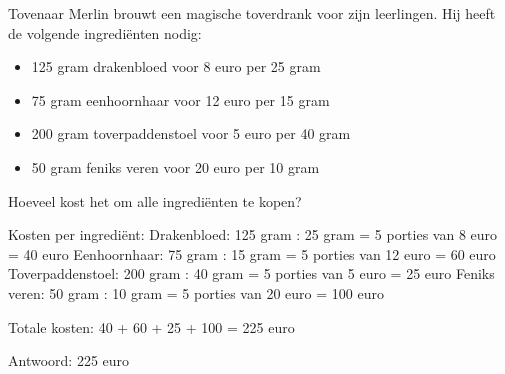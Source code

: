 \begin{opgave}
Tovenaar Merlin brouwt een magische toverdrank voor zijn leerlingen. Hij heeft 
de volgende ingrediënten nodig:
\begin{itemize}
\item 125 gram drakenbloed voor 8 euro per 25 gram
\item 75 gram eenhoornhaar voor 12 euro per 15 gram
\item 200 gram toverpaddenstoel voor 5 euro per 40 gram
\item 50 gram feniks veren voor 20 euro per 10 gram
\end{itemize}
Hoeveel kost het om alle ingrediënten te kopen?
\end{opgave}

\begin{oplossing}
Kosten per ingrediënt:
Drakenbloed: 125 gram : 25 gram = 5 porties van 8 euro = 40 euro
Eenhoornhaar: 75 gram : 15 gram = 5 porties van 12 euro = 60 euro
Toverpaddenstoel: 200 gram : 40 gram = 5 porties van 5 euro = 25 euro
Feniks veren: 50 gram : 10 gram = 5 porties van 20 euro = 100 euro

Totale kosten:
40 + 60 + 25 + 100 = 225 euro

Antwoord: 225 euro
\end{oplossing}
